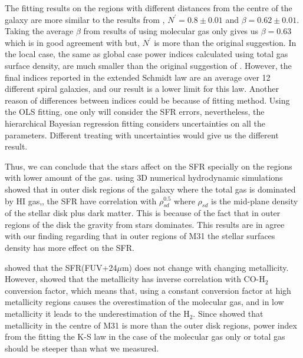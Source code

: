 \documentclass[useAMS,usenatbib]{mn2e}
\newcommand \eqnprime {N^\prime}
\begin{document}
 The fitting results on the regions with different distances from the centre of the galaxy are more similar to the results from \cite{Shi11}, $\eqnprime = 0.8 \pm 0.01$ and $\beta = 0.62\pm0.01$. Taking the average $\beta$  from results of using molecular gas only gives us $\beta = 0.63$ which is in good agreement with \cite{Shi11} but, $\eqnprime$ is more than the original suggestion. In the local case, the same as global case power indices calculated using total gas surface density, are much smaller than the original suggestion of \cite{Shi11}. However, the final indices reported in the extended Schmidt law are an average over 12 different spiral galaxies, and our result is a lower limit for this law. 
 Another reason of differences between indices could be because of fitting method. Using the OLS fitting, one only will consider the SFR errors, nevertheless, the hierarchical Bayesian regression fitting considers uncertainties on all the parameters. Different treating with uncertainties would give us the different result.
 

 Thus, we can conclude that the stars affect on the SFR specially on the regions with lower amount of the gas. \cite{Kim13} using 3D numerical hydrodynamic simulations showed that in outer disk regions of the galaxy  where the total gas is dominated by HI gas,, the SFR have correlation with $\rho_{sd}^{0.5}$ where $\rho_{sd}$ is the mid-plane density of the stellar disk plus dark matter. This is because of the fact that in outer regions of the disk the gravity from stars dominates. This results are in agree with our finding regarding that in outer regions of M31 the stellar surfaces density has more effect on the SFR.

\cite{Leroy08} showed that the SFR(FUV+24$\mu$m) does not change with changing metallicity. However, \cite{Boissier03} showed that the metallicity has inverse correlation with CO-H$_2$ conversion factor, which means that, using a constant conversion factor at high metallicity regions causes the overestimation of the molecular gas, and in low metallicity it leads to the underestimation of the H$_2$. Since \cite{Draine14} showed that metallicity in the centre of M31 is more than the outer disk regions, power index from the fitting the K-S law in the case of the molecular gas only or total gas should be steeper than what we measured.
\end{document}
